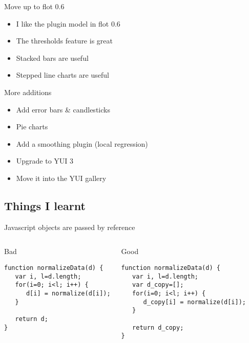 \documentclass{beamer}
\begin{document}
\begin{frame}{Move up to flot 0.6}
  \begin{itemize}
  \item I like the plugin model in flot 0.6
  \item The thresholds feature is great
  \item Stacked bars are useful
  \item Stepped line charts are useful
  \end{itemize}
\end{frame}

\begin{frame}{More additions}
  \begin{itemize}
  \item Add error bars \& candlesticks
  \item Pie charts
  \item Add a smoothing plugin (local regression)
  \item Upgrade to YUI 3
  \item Move it into the YUI gallery
  \end{itemize}
\end{frame}

\subsection{Things I learnt}
\begin{frame}[fragile]{Javascript objects are passed by reference}
  \begin{columns}[c]
    \begin{block}{Bad}
      \begin{verbatim}
function normalizeData(d) {
   var i, l=d.length;
   for(i=0; i<l; i++) {
      d[i] = normalize(d[i]);
   }

   return d;
}
      \end{verbatim}
    \end{block}
    \begin{block}{Good}
      \begin{verbatim}
function normalizeData(d) {
   var i, l=d.length;
   var d_copy=[];
   for(i=0; i<l; i++) {
      d_copy[i] = normalize(d[i]);
   }

   return d_copy;
}
      \end{verbatim}
    \end{block}
  \end{columns}
\end{frame}
\end{document}

